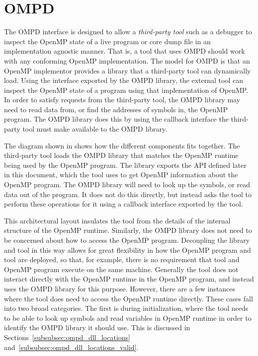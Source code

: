 \section{OMPD}
\label{sec:ompd-overview}
\label{sec:third-party-tool-callback-interface}

The OMPD interface is designed to allow a \emph{third-party tool}
such as a debugger to inspect the OpenMP state of a live program
or core dump file in an implementation agnostic manner.
That is, a tool that uses OMPD should work with any conforming
OpenMP implementation.
The model for OMPD is that an OpenMP implementor provides a
library that a third-party tool can dynamically load.
Using the interface exported by the OMPD library, the external tool can
inspect the OpenMP state of a program using that implementation of OpenMP.
In order to satisfy requests from the third-party tool, the OMPD library
may need to read data from, or find the addresses of symbols in,
the OpenMP program.
The OMPD library does this by using the callback interface the third-party
tool must make available to the OMPD library.

%


The diagram shown in   shows how the different
components fits together.
The third-party tool loads the OMPD library that matches the OpenMP runtime
being used by the OpenMP program.
The library exports the API defined later in this document,
which the tool uses to get OpenMP information about the OpenMP program.
The OMPD library will need to look up the symbols,
or read data out of the program.
It does not do this directly, but instead asks the tool to perform
these operations for it using a callback interface exported by the tool.

This architectural layout insulates the tool from the details
of the internal structure of the OpenMP runtime.
Similarly, the OMPD library does not need to be concerned about
how to access the OpenMP program.
Decoupling the library and tool in this way allows for
great flexibility in how the OpenMP program and tool are deployed,
so that, for example, there is no requirement that tool
and OpenMP program execute on the same machine.
Generally the tool does not interact directly with the OpenMP
runtime in the OpenMP program, and instead uses the OMPD library
for this purpose.
However, there are a few instances where the tool does need
to access the OpenMP runtime directly.
These cases fall into two broad categories.
The first is during initialization, where the tool needs
to be able to look up symbols and read variables in OpenMP runtime
in order to identify the OMPD library it should use.
This is discussed in Sections~\ref{subsubsec:ompd_dll_locations}
and~\ref{subsubsec:ompd_dll_locations_valid}.

